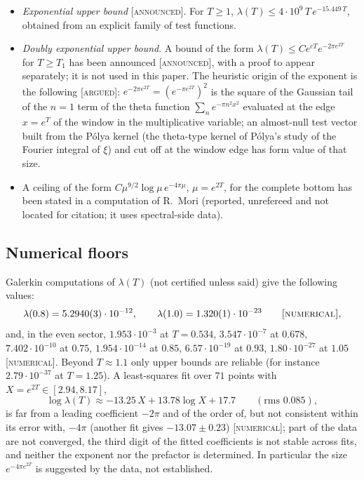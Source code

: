 \documentclass[11pt]{amsart}
\theoremstyle{definition}
\theoremstyle{remark}
\numberwithin{equation}{section}
\newcommand{\lam}{\lambda(T)}                          %
\newcommand{\stag}[1]{\textsc{[#1]}}
\newcommand{\ARGUED}{\stag{argued}}
\newcommand{\NUM}{\stag{numerical}}
\newcommand{\ANNOUNCED}{\stag{announced}}
\begin{document}
\begin{itemize}
\item \emph{Exponential upper bound} \ANNOUNCED. For $T\ge1$,
$\lam\le4\cdot10^{9}\,T\,e^{-15.449\,T}$, obtained from an explicit family of test functions.
\item \emph{Doubly exponential upper bound}. A bound of the form $\lam\le Ce^{cT}e^{-2\pi e^{2T}}$ for $T\ge T_1$ has been
announced \ANNOUNCED, with a proof to appear separately; it is not used in this paper. The heuristic origin of the exponent is the following \ARGUED: $e^{-2\pi e^{2T}}=(e^{-\pi e^{2T}})^2$ is the square
of the Gaussian tail of the $n=1$ term of the theta function $\sum_n e^{-\pi n^2x^2}$ evaluated at the edge
$x=e^{T}$ of the window in the multiplicative variable; an almost-null test vector built from the Pólya kernel
(the theta-type kernel of Pólya's study of the Fourier integral of $\xi$) and cut off at the window edge
has form value of that size.
\item A ceiling of the form $C\mu^{9/2}\log\mu\,e^{-4\pi\mu}$, $\mu=e^{2T}$, for the complete bottom has been stated in
a computation of R.~Mori (reported, unrefereed and not located for citation; it uses spectral-side data).
\end{itemize}

\subsection{Numerical floors}

Galerkin computations of $\lam$ (not certified unless said) give the following values:
\[
\lambda(0.8)=5.2940(3)\cdot10^{-12},\qquad \lambda(1.0)=1.320(1)\cdot10^{-23}\qquad\NUM,
\]
and, in the even sector, $1.953\cdot10^{-3}$ at $T=0.534$, $3.547\cdot10^{-7}$ at $0.678$, $7.402\cdot10^{-10}$ at $0.75$,
$1.954\cdot10^{-14}$ at $0.85$, $6.57\cdot10^{-19}$ at $0.93$, $1.80\cdot10^{-27}$ at $1.05$ \NUM. Beyond $T\approx1.1$
only upper bounds are reliable (for instance $2.79\cdot10^{-37}$ at $T=1.25$). A least-squares fit over $71$
points with $X=e^{2T}\in[2.94,8.17]$,
\[
\log\lam\approx-13.25\,X+13.78\log X+17.7\qquad(\text{rms }0.085),
\]
is far from a leading coefficient $-2\pi$ and of the order of, but not consistent within its error with, $-4\pi$
(another fit gives $-13.07\pm0.23$) \NUM; part of the data are not converged, the third digit of the fitted
coefficients is not stable across fits, and neither the exponent nor the prefactor is determined. In particular the
size $e^{-4\pi e^{2T}}$ is suggested by the data, not established.
\end{document}
